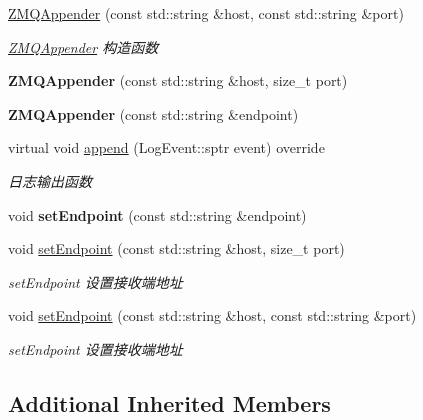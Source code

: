 \begin{DoxyCompactItemize}
\item 
\hyperlink{classDAQ_1_1ZMQAppender_ab5078b0b11a62feda72cda2259524517}{Z\+M\+Q\+Appender} (const std\+::string \&host, const std\+::string \&port)
\begin{DoxyCompactList}\small\item\em \hyperlink{classDAQ_1_1ZMQAppender}{Z\+M\+Q\+Appender} 构造函数 \end{DoxyCompactList}\item 
\mbox{\label{classDAQ_1_1ZMQAppender_a8305a007ad1587beed951bff9166372f}} 
{\bfseries Z\+M\+Q\+Appender} (const std\+::string \&host, size\+\_\+t port)
\item 
\mbox{\label{classDAQ_1_1ZMQAppender_a3a2e50c929c78188585bf0640b91a3f6}} 
{\bfseries Z\+M\+Q\+Appender} (const std\+::string \&endpoint)
\item 
virtual void \hyperlink{classDAQ_1_1ZMQAppender_a8dc33b1b2768e9e97438607a52b136d4}{append} (Log\+Event\+::sptr event) override
\begin{DoxyCompactList}\small\item\em 日志输出函数 \end{DoxyCompactList}\item 
\mbox{\label{classDAQ_1_1ZMQAppender_a93ae54d73236fd2a43894760cf5f1710}} 
void {\bfseries set\+Endpoint} (const std\+::string \&endpoint)
\item 
void \hyperlink{classDAQ_1_1ZMQAppender_a3e872d262ba9a6e9c17c779f73a1c3a3}{set\+Endpoint} (const std\+::string \&host, size\+\_\+t port)
\begin{DoxyCompactList}\small\item\em set\+Endpoint 设置接收端地址 \end{DoxyCompactList}\item 
void \hyperlink{classDAQ_1_1ZMQAppender_a3eba37ec932d66030bbc1a6f5c751005}{set\+Endpoint} (const std\+::string \&host, const std\+::string \&port)
\begin{DoxyCompactList}\small\item\em set\+Endpoint 设置接收端地址 \end{DoxyCompactList}\end{DoxyCompactItemize}
\subsection*{Additional Inherited Members}


